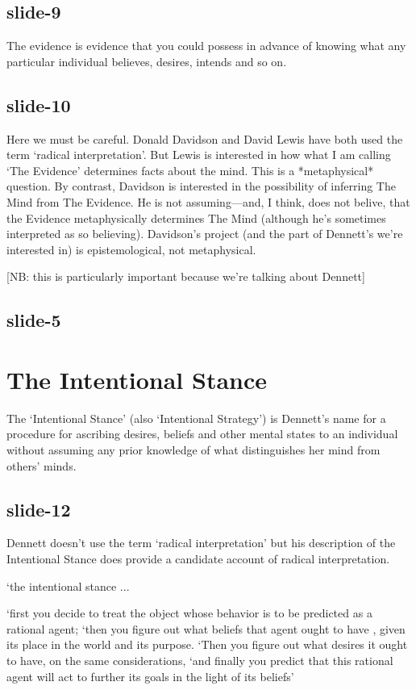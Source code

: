 \documentclass[12pt,\papersize]{extarticle}
\begin{document}
\subsection{slide-9}
The evidence is evidence that you could possess in advance of knowing
what any particular individual believes, desires, intends and so on.

\subsection{slide-10}
Here we must be careful.
Donald Davidson and David Lewis have both used the term ‘radical interpretation’.
But Lewis is interested in how what I am calling ‘The Evidence’ determines facts about
the mind.  This is a *metaphysical* question.
By contrast, Davidson is interested in the possibility of inferring The Mind from
The Evidence.  He is not assuming---and, I think, does not belive, that the Evidence
metaphysically determines The Mind (although he’s sometimes interpreted as so believing).
Davidson’s project (and the part of Dennett’s we’re interested in) is
epistemological, not metaphysical.

[NB: this is particularly important because we’re talking about Dennett]

\subsection{slide-5}


\section{The Intentional Stance}

The ‘Intentional Stance’ (also ‘Intentional Strategy’) is Dennett’s name for
a procedure for ascribing desires, beliefs and other mental states to an individual
without assuming any prior knowledge of what distinguishes her mind from others’ minds.

\subsection{slide-12}
Dennett doesn’t use the term ‘radical interpretation’ but his description
of the Intentional Stance does provide a candidate account of radical
interpretation.

‘the intentional stance ...

‘first you decide to treat the object whose behavior is to be predicted as a rational agent; ‘then you figure out what beliefs that agent ought to have , given its place in the world and its purpose. ‘Then you figure out what desires it ought to have, on the same considerations,
‘and finally you predict that this rational agent will act to further its goals in the light of its beliefs’
\end{document}
